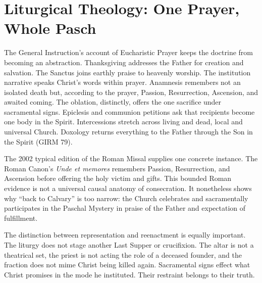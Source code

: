 \section{Liturgical Theology: One Prayer, Whole Pasch}

The General Instruction's account of Eucharistic Prayer keeps the doctrine
from becoming an
abstraction. Thanksgiving addresses the Father for creation and salvation.
The Sanctus joins earthly praise to heavenly worship. The institution
narrative speaks Christ's words within prayer. Anamnesis remembers not an
isolated death but, according to the prayer, Passion, Resurrection, Ascension,
and awaited coming. The oblation, distinctly, offers the one sacrifice under
sacramental signs.
Epiclesis and communion petitions ask that recipients become one body in the
Spirit. Intercessions stretch across living and dead, local and universal
Church. Doxology returns everything to the Father through the Son in the
Spirit (GIRM 79).

The 2002 typical edition of the Roman Missal supplies one concrete instance.
The Roman Canon's \emph{Unde et memores} remembers Passion, Resurrection, and
Ascension before offering the holy victim and gifts. This bounded Roman
evidence is not a universal causal anatomy of consecration. It nonetheless
shows why ``back to Calvary'' is too narrow: the Church celebrates and
sacramentally participates in the Paschal Mystery in praise of the Father and
expectation of fulfillment.

The distinction between representation and reenactment is equally important.
The liturgy does not stage another Last Supper or crucifixion. The altar is not
a theatrical set, the priest is not acting the role of a deceased founder, and
the fraction does not mime Christ being killed again. Sacramental signs effect
what Christ promises in the mode he instituted. Their restraint belongs to
their truth.

